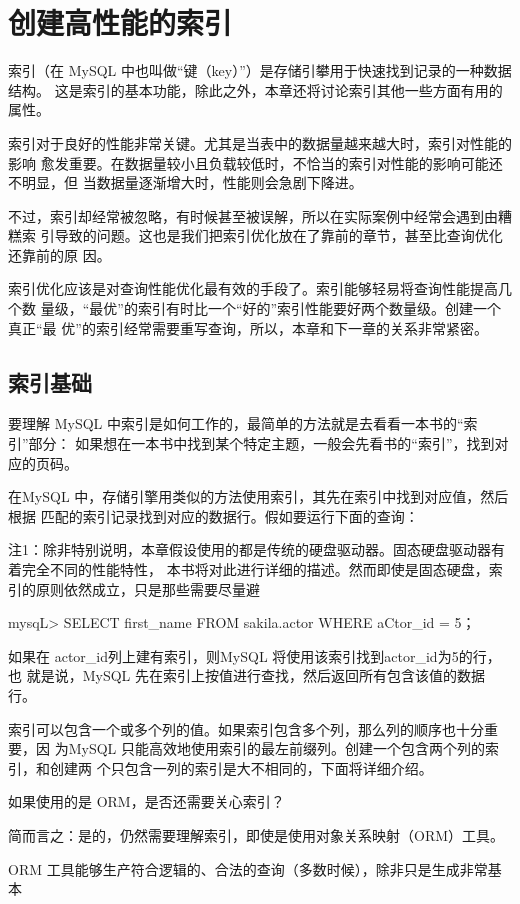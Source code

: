 \chapter{创建高性能的索引}
索引（在 MySQL 中也叫做“键（key）”）是存储引攀用于快速找到记录的一种数据结构。
这是索引的基本功能，除此之外，本章还将讨论索引其他一些方面有用的属性。

索引对于良好的性能非常关键。尤其是当表中的数据量越来越大时，索引对性能的影响
愈发重要。在数据量较小且负载较低时，不恰当的索引对性能的影响可能还不明显，但
当数据量逐渐增大时，性能则会急剧下降进。

不过，索引却经常被忽略，有时候甚至被误解，所以在实际案例中经常会遇到由糟糕索
引导致的问题。这也是我们把索引优化放在了靠前的章节，甚至比查询优化还靠前的原
因。

索引优化应该是对查询性能优化最有效的手段了。索引能够轻易将查询性能提高几个数
量级，“最优”的索引有时比一个“好的”索引性能要好两个数量级。创建一个真正“最
优”的索引经常需要重写查询，所以，本章和下一章的关系非常紧密。

\section{索引基础}
要理解 MySQL 中索引是如何工作的，最简单的方法就是去看看一本书的“索引”部分：
如果想在一本书中找到某个特定主题，一般会先看书的“索引”，找到对应的页码。

在MySQL 中，存储引擎用类似的方法使用索引，其先在索引中找到对应值，然后根据
匹配的索引记录找到对应的数据行。假如要运行下面的查询：

注1：除非特别说明，本章假设使用的都是传统的硬盘驱动器。固态硬盘驱动器有着完全不同的性能特性，
本书将对此进行详细的描述。然而即使是固态硬盘，索引的原则依然成立，只是那些需要尽量避

mysqL> SELECT first\_name FROM sakila.actor WHERE aCtor\_id = 5；

如果在 actor\_id列上建有索引，则MySQL 将使用该索引找到actor\_id为5的行，也
就是说，MySQL 先在索引上按值进行查找，然后返回所有包含该值的数据行。

索引可以包含一个或多个列的值。如果索引包含多个列，那么列的顺序也十分重要，因
为MySQL 只能高效地使用索引的最左前缀列。创建一个包含两个列的索引，和创建两
个只包含一列的索引是大不相同的，下面将详细介绍。

如果使用的是 ORM，是否还需要关心索引？

简而言之：是的，仍然需要理解索引，即使是使用对象关系映射（ORM）工具。

ORM 工具能够生产符合逻辑的、合法的查询（多数时候），除非只是生成非常基本

